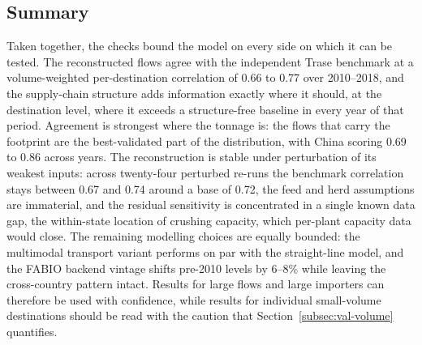\documentclass[pdflatex,sn-nature]{sn-jnl}%
\begin{document}
\subsection{Summary}\label{subsec:val-summary}
Taken together, the checks bound the model on every side on which it
can be tested. The reconstructed flows agree with the independent
Trase benchmark at a volume-weighted per-destination correlation of
0.66 to 0.77 over 2010--2018, and the supply-chain structure adds
information exactly where it should, at the destination level, where
it exceeds a structure-free baseline in every year of that period.
Agreement is strongest where the tonnage is: the flows that carry the
footprint are the best-validated part of the distribution, with China
scoring 0.69 to 0.86 across years. The reconstruction is
stable under perturbation of its weakest inputs: across twenty-four
perturbed re-runs the benchmark correlation stays between 0.67 and
0.74 around a base of 0.72, the feed and herd assumptions are
immaterial, and the residual
sensitivity is concentrated in a single known data gap, the
within-state location of crushing capacity, which per-plant capacity
data would close. The remaining modelling choices are equally bounded:
the multimodal transport variant performs on par with the
straight-line model, and the FABIO backend vintage shifts pre-2010
levels by 6--8\% while leaving the cross-country pattern intact.
Results for large flows and large importers can therefore be used with
confidence, while results for individual small-volume destinations
should be read with the caution that Section~\ref{subsec:val-volume}
quantifies.

%
\end{document}
